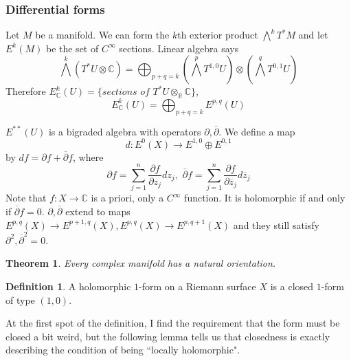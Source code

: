 \documentclass[12pt]{article}
\theoremstyle{plain}
\newtheorem{theorem}[equation]{Theorem}
\theoremstyle{definition}
\newtheorem{definition}[equation]{Definition}
\newcommand{\IC}{\mathbb{C}}
\newcommand{\IR}{\mathbb{R}}
\newcommand\tensor{{\otimes}}
\newcommand{\<}{\langle}
\renewcommand{\>}{\rangle}
\newcommand{\bp}{\overline{\partial}}
\newcommand{\p}{\partial}
\newcommand{\bz}{\overline{z}}
\begin{document}
\subsubsection{Differential forms}
Let $M$ be a manifold. We can form the $k$th exterior product $\bigwedge^k T^* M$ and let $E^k(M)$ be the set of $C^\infty$ sections. Linear algebra says 
$$ \bigwedge^k (T^* U \tensor \IC) = \bigoplus_{p + q = k} (\bigwedge^p T^{1,0} U) \tensor (\bigwedge^q T^{0, 1} U) $$ 
Therefore $E_\IC^k(U) = \{ \textit{sections of } T^* U \tensor_\IR \IC \}$, 
$$ E^k_\IC (U) = \bigoplus_{p + q = k} E^{p, q}(U) $$ 

$E^{**}(U)$ is a bigraded algebra with operators $\p, \bp$. We define a map 
$$ d : E^0(X) \to E^{1, 0} \oplus E^{0, 1} $$ by $df = \p f + \bp f$, where $$\p f = \sum_{j = 1}^n \frac{\p f}{\p z_j} dz_j, \, \, \bp f = \sum_{j = 1}^n \frac{\p f}{\p \bz_j} d\bz_j$$ Note that $f : X \to \IC$ is a priori, only a $C^\infty$ function. It is holomorphic if and only if $\bp f = 0$. $\p, \bp$ extend to maps $E^{p,q}(X) \to E^{p+1, q}(X), E^{p, q}(X) \to E^{p, q+1}(X)$ and they still satisfy $\p^2 , \bp^2 = 0$. 

\begin{theorem}
Every complex manifold has a natural orientation. 
\end{theorem}

\begin{definition}
A holomorphic $1$-form on a Riemann surface $X$ is a closed $1$-form of type $(1, 0)$. 
\end{definition}

At the first spot of the definition, I find the requirement that the form must be closed a bit weird, but the following lemma tells us that closedness is exactly describing the condition of being ``locally holomorphic". 
\end{document}
